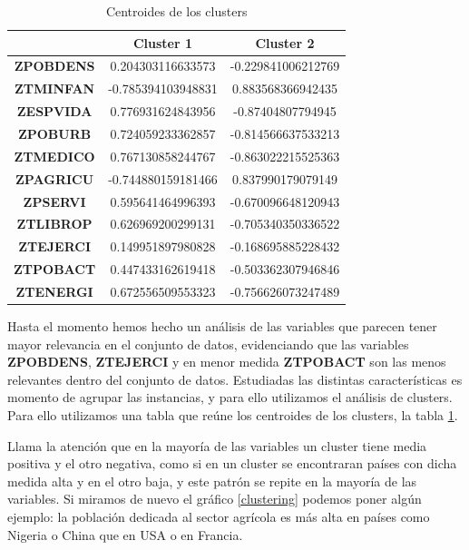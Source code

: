 \documentclass[letterpaper,11pt]{article}
\begin{document}
\begin{table}[h]
\centering
\renewcommand{\tablename}{Tabla}
\begin{tabular}{ccc}
\hline
                  & \textbf{Cluster 1} & \textbf{Cluster 2} \\ \hline
\textbf{ZPOBDENS} & 0.204303116633573  & -0.229841006212769 \\
\textbf{ZTMINFAN} & -0.785394103948831 & 0.883568366942435  \\
\textbf{ZESPVIDA} & 0.776931624843956  & -0.87404807794945  \\
\textbf{ZPOBURB}  & 0.724059233362857  & -0.814566637533213 \\
\textbf{ZTMEDICO} & 0.767130858244767  & -0.863022215525363 \\
\textbf{ZPAGRICU} & -0.744880159181466 & 0.837990179079149  \\
\textbf{ZPSERVI}  & 0.595641464996393  & -0.670096648120943 \\
\textbf{ZTLIBROP} & 0.626969200299131  & -0.705340350336522 \\
\textbf{ZTEJERCI} & 0.149951897980828  & -0.168695885228432 \\
\textbf{ZTPOBACT} & 0.447433162619418  & -0.503362307946846 \\
\textbf{ZTENERGI} & 0.672556509553323  & -0.756626073247489 \\ \hline
\end{tabular}
\caption{Centroides de los clusters}
\label{AC_tabla}
\end{table}

Hasta el momento hemos hecho un análisis de las variables que parecen tener mayor relevancia en el conjunto de datos, evidenciando que las variables \textbf{ZPOBDENS}, \textbf{ZTEJERCI} y en menor medida \textbf{ZTPOBACT} son las menos relevantes dentro del conjunto de datos. Estudiadas las distintas características es momento de agrupar las instancias, y para ello utilizamos el análisis de clusters. Para ello utilizamos una tabla que reúne los centroides de los clusters, la tabla \ref{AC_tabla}. 

Llama la atención que en la mayoría de las variables un cluster tiene media positiva y el otro negativa, como si en un cluster se encontraran países con dicha medida alta y en el otro baja, y este patrón se repite en la mayoría de las variables. Si miramos de nuevo el gráfico \ref{clustering} podemos poner algún ejemplo: la población dedicada al sector agrícola es más alta en países como Nigeria o China que en USA o en Francia.
\end{document}
